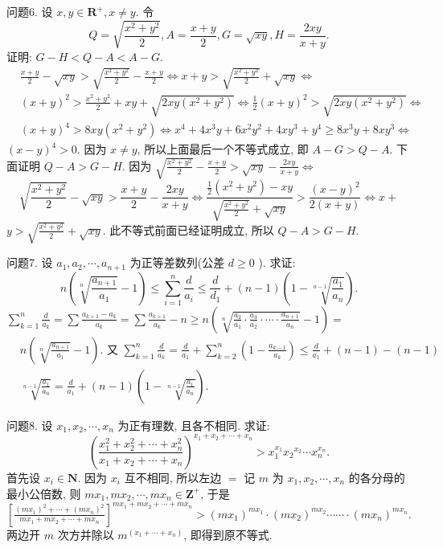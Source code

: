 问题6. 设 $x, y \in \mathbf{R}^{+}, x \neq y$. 令
$$
Q=\sqrt{\frac{x^2+y^2}{2}}, A=\frac{x+y}{2}, G=\sqrt{x y}, H=\frac{2 x y}{x+y} .
$$
证明: $G-H<Q-A<A-G$.
$$
\begin{aligned}
&  \frac{x+y}{2}-\sqrt{x y}>\sqrt{\frac{x^2+y^2}{2}}-\frac{x+y}{2} \Leftrightarrow x+y>\sqrt{\frac{x^2+y^2}{2}}+\sqrt{x y} \Leftrightarrow \\
& (x+y)^2>\frac{x^2+y^2}{2}+x y+\sqrt{2 x y\left(x^2+y^2\right)} \Leftrightarrow \frac{1}{2}(x+y)^2>\sqrt{2 x y\left(x^2+y^2\right)} \Leftrightarrow \\
& (x+y)^4>8 x y\left(x^2+y^2\right) \Leftrightarrow x^4+4 x^3 y+6 x^2 y^2+4 x y^3+y^4 \geqslant 8 x^3 y+8 x y^3 \Leftrightarrow
\end{aligned}
$$
$(x-y)^4>0$. 因为 $x \neq y$, 所以上面最后一个不等式成立, 即 $A-G>Q-A$.
下面证明 $Q-A>G-H$. 因为 $\sqrt{\frac{x^2+y^2}{2}}-\frac{x+y}{2}>\sqrt{x y}-\frac{2 x y}{x+y} \Leftrightarrow$
$$
\sqrt{\frac{x^2+y^2}{2}}-\sqrt{x y}>\frac{x+y}{2}-\frac{2 x y}{x+y} \Leftrightarrow \frac{\frac{1}{2}\left(x^2+y^2\right)-x y}{\sqrt{\frac{x^2+y^2}{2}}+\sqrt{x y}}>\frac{(x-y)^2}{2(x+y)} \Leftrightarrow x+
$$
$y>\sqrt{\frac{x^2+y^2}{2}}+\sqrt{x y}$. 此不等式前面已经证明成立, 所以 $Q-A>G-H$.



问题7. 设 $a_1, a_2, \cdots, a_{n+1}$ 为正等差数列(公差 $d \geqslant 0$ ). 求证:
$$
n\left(\sqrt[n]{\frac{a_{n+1}}{a_1}}-1\right) \leqslant \sum_{i=1}^n \frac{d}{a_i} \leqslant \frac{d}{d_1}+(n-1)\left(1-\sqrt[n-1]{\frac{a_1}{a_n}}\right) .
$$
$\sum_{k=1}^n \frac{d}{a_k}=\sum \frac{a_{k+1}-a_k}{a_k}=\sum \frac{a_{k+1}}{a_k}-n \geqslant n\left(\sqrt[n]{\frac{a_2}{a_1} \cdot \frac{a_3}{a_2} \cdot \cdots \cdot \frac{a_{n+1}}{a_n}}-1\right)=$
$$
\begin{aligned}
& n\left(\sqrt[n]{\frac{a_{n+1}}{a_1}}-1\right) . \text { 又 } \sum_{k=1}^n \frac{d}{a_k}=\frac{d}{a_1}+\sum_{k=2}^n\left(1-\frac{a_{k-1}}{a_k}\right) \leqslant \frac{d}{a_1}+(n-1)-(n-1) \\
& \sqrt[n-1]{\frac{a_1}{a_n}}=\frac{d}{a_1}+(n-1)\left(1-\sqrt[n-1]{\frac{a_1}{a_n}}\right) .
\end{aligned}
$$



问题8. 设 $x_1, x_2, \cdots, x_n$ 为正有理数, 且各不相同.
求证:
$$
\left(\frac{x_1^2+x_2^2+\cdots+x_n^2}{x_1+x_2+\cdots+x_n}\right)^{x_1+x_2+\cdots+x_n}>x_1^{x_1} x_2{ }^{x_2} \cdots x_n^{x_n} .
$$
首先设 $x_i \in \mathbf{N}$. 因为 $x_i$ 互不相同, 所以左边 $=$
记 $m$ 为 $x_1, x_2, \cdots, x_n$ 的各分母的最小公倍数, 则 $m x_1, m x_2, \cdots, m x_n \in \mathbf{Z}^{+}$, 于是 $\left[\frac{\left(m x_1\right)^2+\cdots+\left(m x_n\right)^2}{m x_1+m x_2+\cdots+m x_n}\right]^{m x_1+m x_2+\cdots+m x_n}>\left(m x_1\right)^{m x_1} \cdot\left(m x_2\right)^{m x_2} \cdots \cdots \cdot \left(m x_n\right)^{m x_n}$. 两边开 $m$ 次方并除以 $m^{\left(x_1+\cdots+x_n\right)}$, 即得到原不等式.



